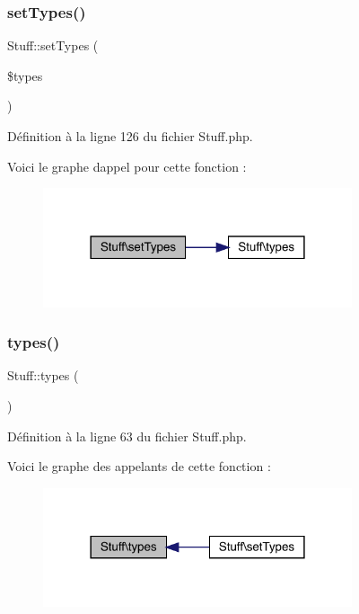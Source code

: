\subsubsection{\texorpdfstring{set\+Types()}{setTypes()}}
{\footnotesize\ttfamily Stuff\+::set\+Types (\begin{DoxyParamCaption}\item[{}]{\$types }\end{DoxyParamCaption})}



Définition à la ligne 126 du fichier Stuff.\+php.

Voici le graphe d\textquotesingle{}appel pour cette fonction \+:\nopagebreak
\begin{figure}[H]
\begin{center}
\leavevmode
\includegraphics[width=258pt]{class_stuff_ae5e915d228462b653eeb32f277cd86d7_cgraph}
\end{center}
\end{figure}
\mbox{\label{class_stuff_a31db818ab10befbdba9c8d24d62dbb90}} 
\subsubsection{\texorpdfstring{types()}{types()}}
{\footnotesize\ttfamily Stuff\+::types (\begin{DoxyParamCaption}{ }\end{DoxyParamCaption})}



Définition à la ligne 63 du fichier Stuff.\+php.

Voici le graphe des appelants de cette fonction \+:\nopagebreak
\begin{figure}[H]
\begin{center}
\leavevmode
\includegraphics[width=258pt]{class_stuff_a31db818ab10befbdba9c8d24d62dbb90_icgraph}
\end{center}
\end{figure}



